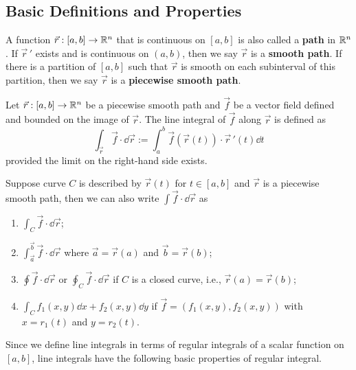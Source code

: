\documentclass[a4paper]{ctexart}
\begin{document}
    \subsection{Basic Definitions and Properties}
    \begin{mydef}
        A function $\vec r : [a,b] \to \mathbb{R}^n$ that is continuous on $[a,b]$ is also called a \textbf{path} in $\mathbb{R}^n$. If $\vec r \, '$ exists and is continuous on $(a,b)$, then we say $\vec r$ is a \textbf{smooth path}. If there is a partition of $[a,b]$ such that $\vec r$ is smooth on each subinterval of this partition, then we say $\vec r$ is a \textbf{piecewise smooth path}.
    \end{mydef}
    \begin{mydef}
        Let $\vec r:[a,b] \to \mathbb{R}^n$ be a piecewise smooth path and $\vec f$ be a vector field defined and bounded on the image of $\vec r$. The line integral of $\vec f$ along $\vec r$ is defined as
        $$ \int_{\vec r} \vec f \cdot \dd\vec r := \int_a^b \vec f(\vec r(t)) \cdot \vec r\,'(t) \dd t $$
        provided the limit on the right-hand side exists.
    \end{mydef}
    \begin{myrmk}
        Suppose curve $C$ is described by $\vec r(t)$ for $t\in [a,b]$ and $\vec r$ is a piecewise smooth path, then we can also write $\displaystyle \int \vec f \cdot \dd \vec r$ as
        \begin{enumerate}
            \item $\displaystyle \int_C \vec f \cdot \dd \vec r$;
            \item $\displaystyle \int_{\vec a}^{\vec b} \vec f \cdot \dd \vec r$ where $\vec a = \vec r(a)$ and $\vec b = \vec r(b)$;
            \item $\displaystyle \oint \vec f \cdot \dd \vec r$ or $\displaystyle \oint_C \vec f \cdot \dd \vec r$ if $C$ is a closed curve, i.e., $\vec r(a) = \vec r(b)$;
            \item $\displaystyle \int_{C} f_1(x,y) \dd x + f_2(x,y) \dd y$ if $\vec f = (f_1(x,y), f_2(x,y))$ with $x=r_1(t)$ and $y=r_2(t)$.
        \end{enumerate}
    \end{myrmk}
    \begin{myrmk}
        Since we define line integrals in terms of regular integrals of a scalar function on $[a,b]$, line integrals have the following basic properties of regular integral.
    \end{myrmk}
\end{document}
